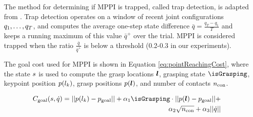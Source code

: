 
The method for determining if MPPI is trapped, called trap detection, is adapted from \cite{TAMPC}. Trap detection operates on a window of recent joint configurations $q_1,\dots,q_T$, and computes the average one-step state difference $\bar{q} = \frac{q_T-q_1}{T}$ and keeps a running maximum of this value $\bar{q}^+$ over the trial. MPPI is considered trapped when the ratio $\frac{\bar{q}}{\bar{q}^+}$ is below a threshold (0.2-0.3 in our experiments).

The goal cost used for MPPI is shown in Equation \eqref{eq:pointReachingCost}, where the state $s$ is used to compute the grasp locations $\bm{l}$, grasping state $\isGrasping$, keypoint position $p(l_k)$, grasp positions $p(\bm{l})$, and number of contacts $n_\text{con}$.

\begin{equation}
    \label{eq:pointReachingCost}
    \begin{split}
        \goalCost(\state,\qvel) = || p(\kp) - \goalPoint || + \alpha_1 \isGrasping \cdot || p(\locs) - \goalPoint || + \\
        \alpha_2\sqrt{\ncon} + \alpha_3 || \qvel ||
    \end{split}
\end{equation}

